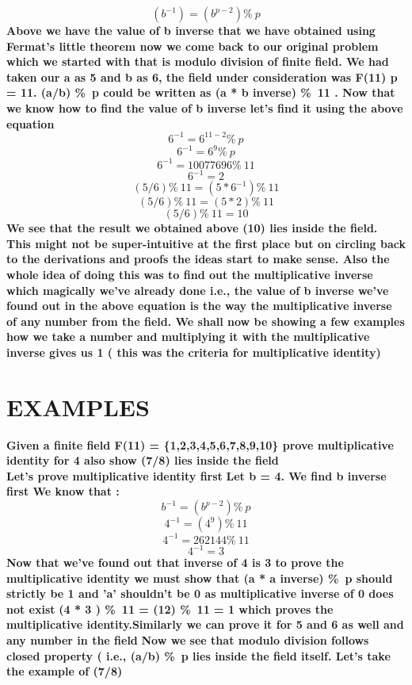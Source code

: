 \documentclass{article}
\begin{document}
\textbf {\[ (b^{-1}) = (b ^{p-2})\%\ p \] }
\textbf {Above we have the value of b inverse that we have obtained using Fermat's little theorem now we come back to our original problem which we started with that is modulo division of finite field. We had taken our a as 5 and b as 6, the field under consideration was F(11) p = 11. (a/b) \%\ p could be written as (a * b inverse) \%\ 11 . Now that we know how to find the value of b inverse let's find it using the above equation}
\textbf {\[ 6 ^{-1}  = 6 ^{11 -2} \%\ p \]}
\textbf{\[6 ^{-1} = 6 ^{9} \%\ p \]}
\textbf {\[6 ^{-1} = 10077696 \%\ 11 \]}
\textbf {\[6 ^{-1} = 2\]} 
\textbf {\[ (5/6) \%\ 11 = (5 * 6 ^{-1} ) \%\ 11 \]}
\textbf {\[ (5/6) \%\ 11 = (5 * 2 ) \%\ 11 \]}
\textbf {\[ (5/6) \%\ 11 = 10 \]}
\textbf { We see that the result we obtained above (10) lies inside the field. This might not be super-intuitive at the first place but on circling back to the derivations and proofs the ideas start to make sense. Also the whole idea of doing this was to find out the multiplicative inverse which magically we've already done i.e., the value of b inverse we've found out in the above equation is the way the multiplicative inverse of any number from the field. We shall now be showing a few examples how we take  a number and multiplying it with the multiplicative inverse gives us 1 ( this was the criteria for multiplicative identity) }

\pagebreak 
\section * {EXAMPLES}
\textbf {Given a finite field F(11) = \{1,2,3,4,5,6,7,8,9,10\} prove multiplicative identity for 4 also show  (7/8) lies inside the field}
\\
\textbf {Let's prove multiplicative identity first}
\textbf {Let b = 4. We find b inverse first We know that :}
\textbf{\[b ^{-1} = (b ^{p-2})\%\ p \]}
\textbf{\[4 ^{-1} = (4 ^{9}) \%\ 11 \]}
\textbf{\[4^{-1} = 262144 \%\ 11 \]}
\textbf{ \[4^{-1} = 3 \]}
\textbf{ Now that we've found out that inverse of 4 is 3 to prove the multiplicative identity we must show that (a * a inverse) \%\ p  should strictly be 1 and 'a' shouldn't be 0 as multiplicative inverse of 0 does not exist}
\textbf{(4 * 3 ) \%\ 11 = (12) \%\ 11 = 1  which proves the multiplicative identity.Similarly we can prove it for 5 and 6 as well and any number in the field}
\textbf{ Now we see that modulo division follows closed property ( i.e., (a/b) \%\ p lies inside the field itself. Let's take the example of (7/8) }
\end{document}

